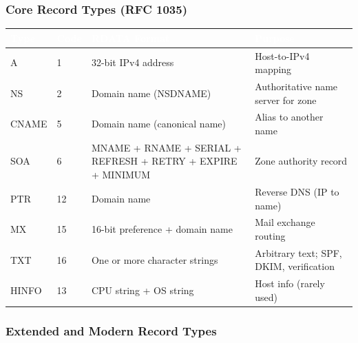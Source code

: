 \documentclass[11pt,letterpaper]{article}
\newcommand{\tableheader}[1]{\textbf{\sffamily\textcolor{white}{#1}}}
\begin{document}
\subsubsection{Core Record Types (RFC 1035)}

\begin{center}
\begin{tabularx}{\textwidth}{C{1.2cm}C{1cm}XL{4.5cm}}
\toprule
{}
\tableheader{Type} & \tableheader{Code} & \tableheader{RDATA Format} & \tableheader{Purpose} \\
\midrule
A & 1 & 32-bit IPv4 address & Host-to-IPv4 mapping \\
NS & 2 & Domain name (NSDNAME) & Authoritative name server for zone \\
CNAME & 5 & Domain name (canonical name) & Alias to another name \\
SOA & 6 & MNAME + RNAME + SERIAL + REFRESH + RETRY + EXPIRE + MINIMUM & Zone authority record \\
PTR & 12 & Domain name & Reverse DNS (IP to name) \\
MX & 15 & 16-bit preference + domain name & Mail exchange routing \\
TXT & 16 & One or more character strings & Arbitrary text; SPF, DKIM, verification \\
HINFO & 13 & CPU string + OS string & Host info (rarely used) \\
\bottomrule
\end{tabularx}
\end{center}

\subsubsection{Extended and Modern Record Types}
\end{document}
